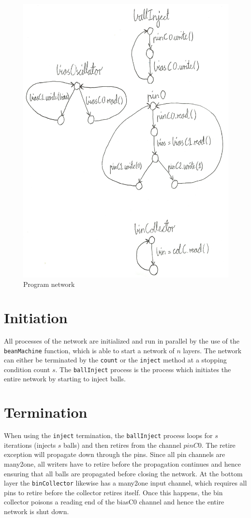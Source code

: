 \documentclass[11pt,a4paper]{article}
\begin{document}
\begin{figure}
    \includegraphics[width=\textwidth]{program_network.jpg}
    \caption{Program network}
    \label{fig:program_network}
\end{figure}

\section{Initiation}
All processes of the network are initialized and run in parallel by the use of
the \texttt{beanMachine} function, which is able to start a network of $n$
layers. The network can either be terminated by the \texttt{count} or the
\texttt{inject} method at a stopping condition count $s$. The
\texttt{ballInject} process is the process which initiates the entire network by
starting to inject balls.

\section{Termination}
When using the \texttt{inject} termination, the \texttt{ballInject} process loops
for $s$ iterations (injects $s$ balls) and then retires from the channel
$pinC0$. The retire exception will propagate down through the pins. Since all
pin channels are many2one, all writers have to retire before the propagation
continues and hence ensuring that all balls are propagated before closing the
network. At the bottom layer the \texttt{binCollector} likewise has a many2one
input channel, which requires all pins to retire before the collector retires
itself. Once this happens, the bin collector poisons a reading end of the biasC0
channel and hence the entire network is shut down.
\end{document}
